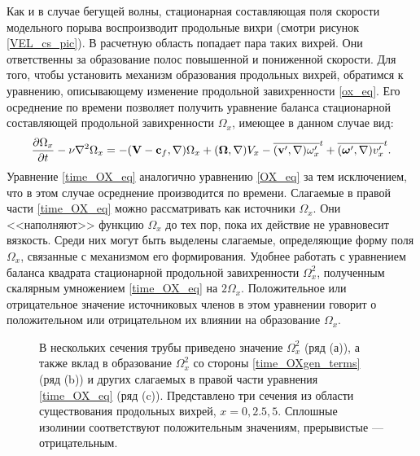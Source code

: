Как и в случае бегущей волны, стационарная составляющая поля скорости модельного порыва воспроизводит продольные вихри (смотри рисунок \ref{VEL_cs_pic}). В расчетную область попадает пара таких вихрей. Они ответственны за образование полос повышенной и пониженной скорости. Для того, чтобы установить механизм образования продольных вихрей, обратимся к уравнению, описывающему изменение продольной завихренности \eqref{ox_eq}. Его осреднение по времени позволяет получить уравнение баланса стационарной составляющей продольной завихренности $\Omega_x$, имеющее в данном случае вид:
\begin{equation} \label{time_OX_eq}
\frac{\partial \Omega_x}{\partial t} - \nu\nabla^2 \Omega_x = - (\mathbf{V} - \mathbf{c}_f, \nabla) \Omega_x + (\mbox{\boldmath$\Omega$}, \nabla) V_x - \overline{(\mathbf{v}', \nabla) \omega'_x}^t + \overline{ (\mbox{\boldmath$\omega$}', \nabla) v'_x }^t.
\end{equation}
Уравнение \eqref{time_OX_eq} аналогично уравнению \eqref{OX_eq} за тем исключением, что в этом случае осреднение производится по времени. Слагаемые в правой части \eqref{time_OX_eq} можно рассматривать как источники $\Omega_x$. Они <<наполняют>> функцию $\Omega_x$ до тех пор, пока их действие не уравновесит вязкость. Среди них могут быть выделены слагаемые, определяющие форму поля $\Omega_x$, связанные с механизмом его формирования. Удобнее работать с уравнением баланса квадрата стационарной продольной завихренности $\Omega_x^2$, полученным скалярным умножением \eqref{time_OX_eq} на $2\Omega_x$. Положительное или отрицательное значение источниковых членов в этом уравнении говорит о положительном или отрицательном их влиянии на образование $\Omega_x$. 


\begin{figure}[h]
\caption{В нескольких сечения трубы приведено значение $\Omega_x^2$ (ряд (а)), а также вклад в образование $\Omega_x^2$ со стороны \eqref{time_OXgen_terms} (ряд (b)) и других слагаемых в правой части уравнения \eqref{time_OX_eq} (ряд (c)). Представлено три сечения из области существования продольных вихрей, $x=0,2.5,5$. Сплошные изолинии соответствуют положительным значениям, прерывистые --- отрицательным.}
\label{mp_OXgen_pic}
\end{figure}


